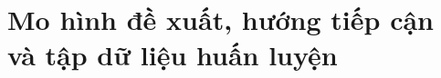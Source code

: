 \section{Mo hình đề xuất, hướng tiếp cận và tập dữ liệu huấn luyện}\label{sec:mo-hinh-e-xuat-huong-tiep-can-va-tap-du-lieu-huan-luyen}